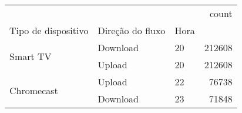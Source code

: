 \begin{tabular}{lllr}
\toprule
 &  &  & count \\
Tipo de dispositivo & Direção do fluxo & Hora &  \\
\midrule
\multirow[t]{2}{*}{Smart TV} & Download & 20 & 212608 \\
\cline{2-4}
 & Upload & 20 & 212608 \\
\cline{1-4} \cline{2-4}
\multirow[t]{2}{*}{Chromecast} & Upload & 22 & 76738 \\
\cline{2-4}
 & Download & 23 & 71848 \\
\cline{1-4} \cline{2-4}
\bottomrule
\end{tabular}
